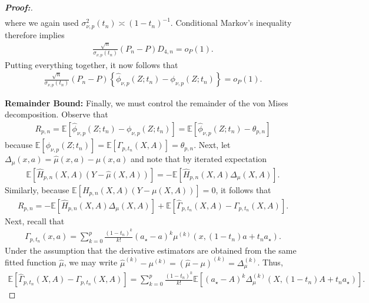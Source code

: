 \documentclass[10pt,a4paper]{amsart}
\begin{document}
\begin{proof}[\textbf{Proof:}]
\begin{align*}
\end{align*}
where we again used $\sigma_{\nu,p}^2(t_n)\asymp(1-t_n)^{-1}$.
Conditional Markov's inequality therefore implies
\begin{align*}
     \frac{\sqrt{n}}{\sigma_{\nu,p}(t_n)} (P_n-P)D_{4,n} = o_P(1).
\end{align*}
Putting everything together, it now follows that
\begin{align*}
      \frac{\sqrt{n}}{\sigma_{\nu,p}(t_n)} (P_n-P) \left\{ \widehat{\phi}_{\nu, p}(Z; t_n) -\phi_{\nu, p}(Z; t_n) \right\} = o_P(1).
\end{align*}
\medskip 

\textbf{Remainder Bound:} Finally, we must control the remainder of the von Mises decomposition. Observe that
\begin{align*}
      R_{p,n} = \mathbb{E}\!\left[ \widehat\phi_{\nu,p}(Z;t_n) - \phi_{\nu,p}(Z;t_n)\right] = \mathbb{E}\!\left[ \widehat\phi_{\nu,p}(Z;t_n) - \theta_{p, n}\right]
\end{align*}
because $\mathbb{E}\!\left[\phi_{\nu,p}(Z;t_n) \right] = \mathbb{E}\!\left[ \Gamma_{p,t_n}(X,A) \right] = \theta_{p,n}$. Next, let $ \Delta_\mu(x,a) = \widehat\mu(x,a)-\mu(x,a)$ and note that by iterated expectation 
\begin{align*}
    \mathbb{E}\!\left[\widehat H_{p,n}(X,A)(Y-\widehat\mu(X,A))\right] = - \mathbb{E}\!\left[ \widehat H_{p,n}(X,A) \Delta_\mu(X,A)\right].
\end{align*}
Similarly, because $\mathbb{E}\!\left[H_{p,n}(X,A)(Y-\mu(X,A))\right] = 0$, it follows that
\begin{align*}
    R_{p,n} = - \mathbb{E}\!\left[ \widehat H_{p,n}(X,A) \Delta_\mu(X,A)\right] + \mathbb{E}\!\left[ \widehat\Gamma_{p,t_n}(X,A) - \Gamma_{p,t_n}(X,A) \right].
\end{align*}
Next, recall that 
\begin{align*}
     \Gamma_{p,t_n}(x,a) = \sum_{k=0}^{p} \frac{(1-t_n)^k}{k!} (a_\star-a)^k \mu^{(k)} \!\left(x,(1-t_n)a + t_n a_\star \right).
\end{align*}
Under the assumption that the derivative estimators are obtained from the same fitted function $\widehat\mu$, we may write $\widehat\mu^{(k)}-\mu^{(k)} = (\widehat\mu-\mu)^{(k)} = \Delta_\mu^{(k)}$. Thus,
\begin{align*}
    \mathbb{E}\!\left[ \widehat\Gamma_{p,t_n}(X,A) - \Gamma_{p,t_n}(X,A)\right] = \sum_{k=0}^{p} \frac{(1-t_n)^k}{k!} \mathbb{E}\!\left[(a_\star-A)^k \Delta_\mu^{(k)}\!\left( X,(1-t_n)A+t_na_\star\right) \right].

\end{align*}
\end{proof}
\end{document}
